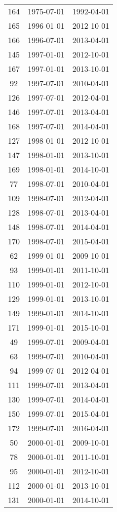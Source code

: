 \begin{tabular}{ccc}
  164 & 1975-07-01 & 1992-04-01 \\ 
  165 & 1996-01-01 & 2012-10-01 \\ 
  166 & 1996-07-01 & 2013-04-01 \\ 
  145 & 1997-01-01 & 2012-10-01 \\ 
  167 & 1997-01-01 & 2013-10-01 \\ 
  92 & 1997-07-01 & 2010-04-01 \\ 
  126 & 1997-07-01 & 2012-04-01 \\ 
  146 & 1997-07-01 & 2013-04-01 \\ 
  168 & 1997-07-01 & 2014-04-01 \\ 
  127 & 1998-01-01 & 2012-10-01 \\ 
  147 & 1998-01-01 & 2013-10-01 \\ 
  169 & 1998-01-01 & 2014-10-01 \\ 
  77 & 1998-07-01 & 2010-04-01 \\ 
  109 & 1998-07-01 & 2012-04-01 \\ 
  128 & 1998-07-01 & 2013-04-01 \\ 
  148 & 1998-07-01 & 2014-04-01 \\ 
  170 & 1998-07-01 & 2015-04-01 \\ 
  62 & 1999-01-01 & 2009-10-01 \\ 
  93 & 1999-01-01 & 2011-10-01 \\ 
  110 & 1999-01-01 & 2012-10-01 \\ 
  129 & 1999-01-01 & 2013-10-01 \\ 
  149 & 1999-01-01 & 2014-10-01 \\ 
  171 & 1999-01-01 & 2015-10-01 \\ 
  49 & 1999-07-01 & 2009-04-01 \\ 
  63 & 1999-07-01 & 2010-04-01 \\ 
  94 & 1999-07-01 & 2012-04-01 \\ 
  111 & 1999-07-01 & 2013-04-01 \\ 
  130 & 1999-07-01 & 2014-04-01 \\ 
  150 & 1999-07-01 & 2015-04-01 \\ 
  172 & 1999-07-01 & 2016-04-01 \\ 
  50 & 2000-01-01 & 2009-10-01 \\ 
  78 & 2000-01-01 & 2011-10-01 \\ 
  95 & 2000-01-01 & 2012-10-01 \\ 
  112 & 2000-01-01 & 2013-10-01 \\ 
  131 & 2000-01-01 & 2014-10-01 \\ 

\end{tabular}
